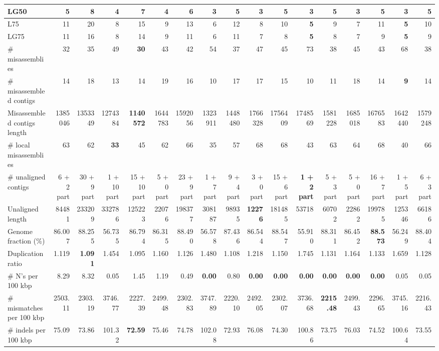 \documentclass[12pt,a4paper]{article}
\begin{document}
\begin{table}[ht]
\begin{center}
\begin{tabular}{|l*{16}{|r}|}
LG50 & 5 & 8 & 4 & 7 & 4 & 6 & {\bf 3} & 5 & {\bf 3} & 5 & {\bf 3} & 5 & {\bf 3} & 5 & {\bf 3} & 5 \\ \hline
L75 & 11 & 20 & 8 & 15 & 9 & 13 & 6 & 12 & 8 & 10 & {\bf 5} & 9 & 7 & 11 & {\bf 5} & 10 \\ \hline
LG75 & 11 & 16 & 8 & 14 & 9 & 11 & 6 & 11 & 7 & 8 & {\bf 5} & 8 & 7 & 9 & {\bf 5} & 9 \\ \hline
\# misassemblies & 32 & 35 & 49 & {\bf 30} & 43 & 42 & 54 & 37 & 47 & 45 & 73 & 38 & 45 & 43 & 68 & 38 \\ \hline
\# misassembled contigs & 14 & 18 & 13 & 14 & 19 & 16 & 10 & 17 & 17 & 15 & 10 & 11 & 18 & 14 & {\bf 9} & 14 \\ \hline
Misassembled contigs length & 1385046 & 1353349 & 1274384 & {\bf 1140572} & 1644783 & 1592056 & 1323911 & 1448480 & 1766328 & 1756409 & 1748569 & 1581228 & 1685018 & 1676583 & 1642440 & 1579248 \\ \hline
\# local misassemblies & 63 & 62 & {\bf 33} & 45 & 62 & 66 & 35 & 57 & 68 & 68 & 43 & 63 & 64 & 68 & 40 & 66 \\ \hline
\# unaligned contigs & 6 + 2 part & 30 + 9 part & 1 + 10 part & 15 + 10 part & 5 + 0 part & 23 + 9 part & 1 + 7 part & 9 + 4 part & 3 + 0 part & 15 + 6 part & {\bf 1 + 2 part} & 5 + 3 part & 5 + 0 part & 16 + 7 part & 1 + 5 part & 6 + 3 part \\ \hline
Unaligned length & 84481 & 233209 & 332786 & 125223 & 22076 & 198377 & 308187 & 98935 & {\bf 12276} & 181485 & 53718 & 60702 & 22862 & 199785 & 125346 & 66186 \\ \hline
Genome fraction (\%) & 86.007 & 88.255 & 56.735 & 86.794 & 86.315 & 88.490 & 56.578 & 87.436 & 86.544 & 88.547 & 55.910 & 88.311 & 86.452 & {\bf 88.573} & 56.249 & 88.404 \\ \hline
Duplication ratio & 1.119 & {\bf 1.091} & 1.454 & 1.095 & 1.160 & 1.126 & 1.480 & 1.108 & 1.218 & 1.150 & 1.745 & 1.131 & 1.164 & 1.133 & 1.659 & 1.128 \\ \hline
\# N's per 100 kbp & 8.29 & 8.32 & 0.05 & 1.45 & 1.19 & 0.49 & {\bf 0.00} & 0.80 & {\bf 0.00} & {\bf 0.00} & {\bf 0.00} & {\bf 0.00} & {\bf 0.00} & {\bf 0.00} & 0.05 & 0.05 \\ \hline
\# mismatches per 100 kbp & 2503.11 & 2303.19 & 3746.77 & 2227.39 & 2499.48 & 2302.83 & 3747.89 & 2220.10 & 2492.05 & 2302.07 & 3736.68 & {\bf 2215.48} & 2499.43 & 2296.65 & 3745.16 & 2216.43 \\ \hline
\# indels per 100 kbp & 75.09 & 73.86 & 101.32 & {\bf 72.59} & 75.46 & 74.78 & 102.08 & 72.93 & 76.08 & 74.30 & 100.86 & 73.75 & 76.03 & 74.52 & 100.64 & 73.55 \\ \hline

\end{tabular}
\end{center}
\end{table}
\end{document}
